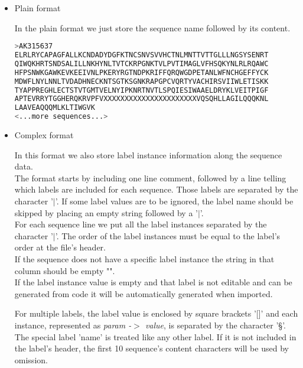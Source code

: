 \begin{itemize}
  \item Plain format
  
  In the plain format we just store the sequence name followed by its content.
  
\begin{lstlisting}[float, language=bash,frame=single,caption={Plain FASTA format.}]
>AK315637
ELRLRYCAPAGFALLKCNDADYDGFKTNCSNVSVVHCTNLMNTTVTTGLLLNGSYSENRT
QIWQKHRTSNDSALILLNKHYNLTVTCKRPGNKTVLPVTIMAGLVFHSQKYNLRLRQAWC
HFPSNWKGAWKEVKEEIVNLPKERYRGTNDPKRIFFQRQWGDPETANLWFNCHGEFFYCK
MDWFLNYLNNLTVDADHNECKNTSGTKSGNKRAPGPCVQRTYVACHIRSVIIWLETISKK
TYAPPREGHLECTSTVTGMTVELNYIPKNRTNVTLSPQIESIWAAELDRYKLVEITPIGF
APTEVRRYTGGHERQKRVPFVXXXXXXXXXXXXXXXXXXXXXXVQSQHLLAGILQQQKNL
LAAVEAQQQMLKLTIWGVK
<...more sequences...>
\end{lstlisting}
  
  \item Complex format
  
  In this format we also store label instance information along the sequence data. \\
  
  The format starts by including one line comment, followed by a line telling which labels are included for each sequence. Those labels are separated by the character '$|$'. If some label values are to be ignored, the label
  name should be skipped by placing an empty string followed by a '$|$'. \\
  
  For each sequence line we put all the label instances separated by the character '$|$'. The order of the label instances must be equal to the label's order at the file's header.\\
  
  If the sequence does not have a specific label instance the string in that column should be empty "".\\
  
  If the label instance value is empty and that label is not editable and can be generated from code it will be automatically generated when imported.
  
  For multiple labels, the label value is enclosed by square brackets '[]' and each instance, represented as \textit{param -$>$ value}, is separated by the character '§'.\\
  
  The special label 'name' is treated like any other label. If it is not included in the label's header, the
  first 10 sequence's content characters will be used by omission.
  

\end{itemize}
